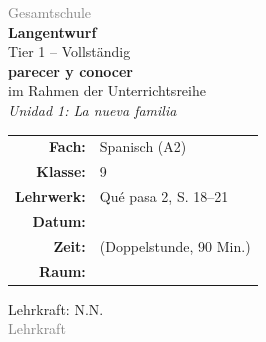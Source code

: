\documentclass[11pt,a4paper]{article}
\newcommand{\fach}{Spanisch}
\newcommand{\jahrgangsstufe}{9}
\newcommand{\schulart}{Gesamtschule}
\newcommand{\stundenthema}{parecer y conocer}
\newcommand{\reihenthema}{Unidad 1: La nueva familia}
\newcommand{\gerniveau}{A2}
\newcommand{\lehrwerk}{Qué pasa 2}
\newcommand{\lehrwerkseite}{S. 18--21}
\newcommand{\lehrkraft}{N.N.}
\newcommand{\ausbildungsstand}{Lehrkraft}
\begin{document}
\begin{titlepage}
    \centering
    \vspace*{2cm}

    {\large\textcolor{gray}{\schulart}}\\[2cm]

    {\Huge\textcolor{fach}{\textbf{Langentwurf}}}\\[0.5cm]
    {\large Tier 1 -- Vollständig}\\[2cm]

    {\LARGE\textbf{\stundenthema}}\\[0.5cm]
    {\large im Rahmen der Unterrichtsreihe}\\[0.3cm]
    {\Large\textit{\reihenthema}}\\[2cm]

    \begin{tabular}{rl}
        \textbf{Fach:} & \fach{} (\gerniveau) \\[0.3cm]
        \textbf{Klasse:} & \jahrgangsstufe \\[0.3cm]
        \textbf{Lehrwerk:} & \lehrwerk, \lehrwerkseite \\[0.3cm]
        \textbf{Datum:} & \underline{\hspace{3cm}} \\[0.3cm]
        \textbf{Zeit:} & \underline{\hspace{3cm}} (Doppelstunde, 90 Min.) \\[0.3cm]
        \textbf{Raum:} & \underline{\hspace{3cm}} \\[0.3cm]
    \end{tabular}

    \vfill

    {\large Lehrkraft: \lehrkraft}\\[0.3cm]
    {\normalsize\textcolor{gray}{\ausbildungsstand}}\\[1cm]

\end{titlepage}

\tableofcontents
\newpage

\end{document}
